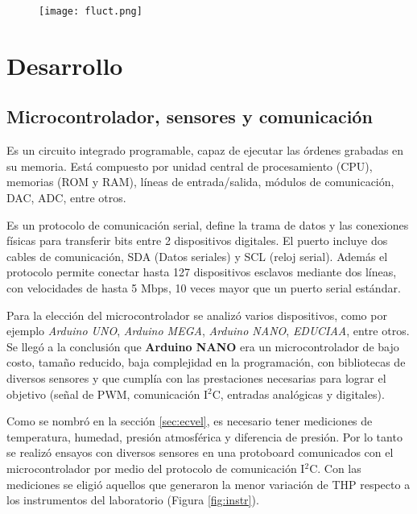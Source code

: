 \begin{figure}[h!]
	\centering
	\texttt{[image: fluct.png]}
	\label{fig:fluct}
\end{figure}


\newpage
\section{Desarrollo}  \label{sec:desarr}

\subsection{Microcontrolador, sensores y comunicación}


\begin{tcolorbox}[colback=blue!5!white,colframe=blue!75!black,title=Microcontrolador] Es un circuito integrado programable, capaz de ejecutar las órdenes grabadas en su memoria. Está compuesto por unidad central de procesamiento (CPU), memorias (ROM y RAM), líneas de entrada/salida, módulos de comunicación, DAC, ADC, entre otros.
\end{tcolorbox}

\begin{tcolorbox}[colback=blue!5!white,colframe=blue!75!black,title=I$^2$C]
	Es un protocolo de comunicación serial, define la trama de datos y las conexiones físicas para transferir bits entre 2 dispositivos digitales. El puerto incluye dos cables de comunicación, SDA (Datos seriales) y SCL (reloj serial). Además el protocolo permite conectar hasta 127 dispositivos esclavos mediante dos líneas, con velocidades de hasta 5 Mbps, 10 veces mayor que un puerto serial estándar. \end{tcolorbox}



	

Para la elección del microcontrolador se analizó varios dispositivos, como por ejemplo \textit{Arduino UNO}, \textit{Arduino MEGA}, \textit{Arduino NANO}, \textit{EDUCIAA}, entre otros. Se llegó a la conclusión que \textbf{Arduino NANO} era un microcontrolador de bajo costo, tamaño reducido, baja complejidad en la programación, con bibliotecas de diversos sensores y que cumplía con las prestaciones necesarias para lograr el objetivo (señal de PWM, comunicación I$^2$C, entradas analógicas y digitales).

Como se nombró en la sección \ref{sec:ecvel}, es necesario tener mediciones de temperatura, humedad, presión atmosférica y diferencia de presión. Por lo tanto se realizó ensayos con diversos sensores en una protoboard comunicados con el microcontrolador por medio del protocolo de comunicación I$^2$C. Con las mediciones se eligió aquellos que generaron la menor variación de THP respecto a los instrumentos del laboratorio (Figura \ref{fig:instr}). 

